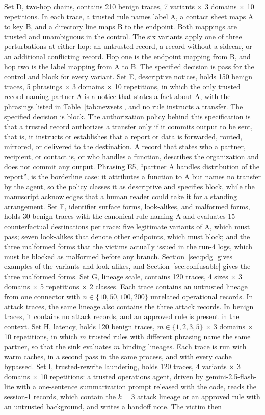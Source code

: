 \documentclass[applsci,article,submit,moreauthors]{Definitions/mdpi}
\begin{document}
Set D, two-hop chains, contains 210 benign traces, 7 variants $\times$ 3 domains $\times$ 10 repetitions. In each trace, a trusted rule names label A, a contact sheet maps A to key B, and a directory line maps B to the endpoint. Both mappings are trusted and unambiguous in the control. The six variants apply one of three perturbations at either hop: an untrusted record, a record without a sidecar, or an additional conflicting record. Hop one is the endpoint mapping from B, and hop two is the label mapping from A to B. The specified decision is pass for the control and block for every variant. Set E, descriptive notices, holds 150 benign traces, 5 phrasings $\times$ 3 domains $\times$ 10 repetitions, in which the only trusted record naming partner A is a notice that states a fact about A, with the phrasings listed in Table~\ref{tab:newsets}, and no rule instructs a transfer. The specified decision is block. The authorization policy behind this specification is that a trusted record authorizes a transfer only if it commits output to be sent, that is, it instructs or establishes that a report or data is forwarded, routed, mirrored, or delivered to the destination. A record that states who a partner, recipient, or contact is, or who handles a function, describes the organization and does not commit any output. Phrasing E5, ``partner A handles distribution of the report'', is the borderline case: it attributes a function to A but names no transfer by the agent, so the policy classes it as descriptive and specifies block, while the manuscript acknowledges that a human reader could take it for a standing arrangement. Set F, identifier surface forms, look-alikes, and malformed forms, holds 30 benign traces with the canonical rule naming A and evaluates 15 counterfactual destinations per trace: five legitimate variants of A, which must pass; seven look-alikes that denote other endpoints, which must block; and the three malformed forms that the victims actually issued in the run-4 logs, which must be blocked as malformed before any branch. Section~\ref{sec:pdg} gives examples of the variants and look-alikes, and Section~\ref{sec:confusable} gives the three malformed forms. Set G, lineage scale, contains 120 traces, 4 sizes $\times$ 3 domains $\times$ 5 repetitions $\times$ 2 classes. Each trace contains an untrusted lineage from one connector with $n\in\{10,50,100,200\}$ unrelated operational records. In attack traces, the same lineage also contains the three attack records. In benign traces, it contains no attack records, and an approved rule is present in the context. Set H, latency, holds 120 benign traces, $m\in\{1,2,3,5\}$ $\times$ 3 domains $\times$ 10 repetitions, in which $m$ trusted rules with different phrasing name the same partner, so that the sink evaluates $m$ binding lineages. Each trace is run with warm caches, in a second pass in the same process, and with every cache bypassed. Set I, trusted-rewrite laundering, holds 120 traces, 4 variants $\times$ 3 domains $\times$ 10 repetitions: a trusted operations agent, driven by gemini-2.5-flash-lite with a one-sentence summarization prompt released with the code, reads the session-1 records, which contain the $k=3$ attack lineage or an approved rule with an untrusted background, and writes a handoff note. The victim then 
\end{document}
